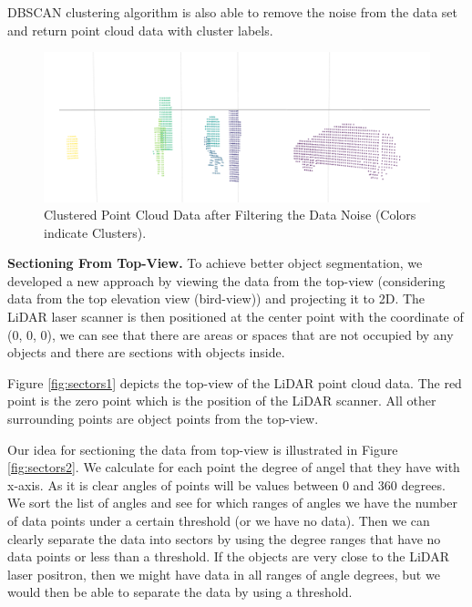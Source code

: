 DBSCAN clustering algorithm is also able to remove the noise from the data set and return point cloud data with cluster labels.


\begin{figure}[!h]
\begin{center}
  \includegraphics[width=.65\linewidth]{./images/seg_noise_removal.png}
  \caption{Clustered Point Cloud Data after Filtering the Data Noise (Colors indicate Clusters). }
  \label{fig:ClusteringWithNoiseFiltering}
\end{center}
\end{figure}



\textbf{Sectioning From Top-View.}
To achieve better object segmentation, we developed a new approach by viewing the data from the top-view (considering data from the top elevation view (bird-view)) and projecting it to 2D. The LiDAR laser scanner is then positioned at the center point with the coordinate of (0, 0, 0), we can see that there are areas or spaces that are not occupied by any objects and there are sections with objects inside.

Figure \ref{fig:sectors1} depicts the top-view of the LiDAR point cloud data.
The red point is the zero point which is the position of the LiDAR scanner. All other surrounding points are object points from the top-view.

Our idea for sectioning the data from top-view is illustrated in Figure \ref{fig:sectors2}. We calculate for each point the degree of angel that they have with x-axis. As it is clear angles of points will be values between 0 and 360 degrees. We sort the list of angles and see for which ranges of angles we have the number of data points under a certain threshold (or we have no data). Then we can clearly separate the data into sectors by using the degree ranges that have no data points or less than a threshold. If the objects are very close to the LiDAR laser positron, then we might have data in all ranges of angle degrees, but we would then be able to separate the data by using a threshold.


